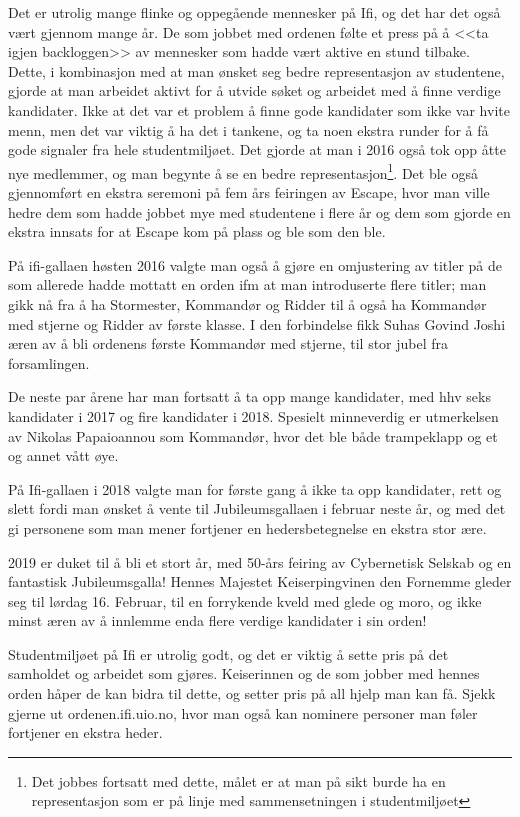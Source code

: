 Det er utrolig mange flinke og oppegående mennesker på Ifi, og det har det også vært gjennom mange år. De som jobbet med ordenen følte et press på å <<ta igjen backloggen>> av mennesker som hadde vært aktive en stund tilbake. Dette, i kombinasjon med at man ønsket seg bedre representasjon av studentene, gjorde at man arbeidet aktivt for å utvide søket og arbeidet med å finne verdige kandidater. Ikke at det var et problem å finne gode kandidater som ikke var hvite menn, men det var viktig å ha det i tankene, og ta noen ekstra runder for å få gode signaler fra hele studentmiljøet. Det gjorde at man i 2016 også tok opp åtte nye medlemmer, og man begynte å se en bedre representasjon\footnote{Det jobbes fortsatt med dette, målet er at man på sikt burde ha en representasjon som er på linje med sammensetningen i studentmiljøet}. Det ble også gjennomført en ekstra seremoni på fem års feiringen av Escape, hvor man ville hedre dem som hadde jobbet mye med studentene i flere år og dem som gjorde en ekstra innsats for at Escape kom på plass og ble som den ble.

På ifi-gallaen høsten 2016 valgte man også å gjøre en omjustering av titler på de som allerede hadde mottatt en orden ifm at man introduserte flere titler; man gikk nå fra å ha Stormester, Kommandør og Ridder til å også ha Kommandør med stjerne og Ridder av første klasse. I den forbindelse fikk Suhas Govind Joshi æren av å bli ordenens første Kommandør med stjerne, til stor jubel fra forsamlingen.

De neste par årene har man fortsatt å ta opp mange kandidater, med hhv seks kandidater i 2017 og fire kandidater i 2018. Spesielt minneverdig er utmerkelsen av Nikolas Papaioannou som Kommandør, hvor det ble både trampeklapp og et og annet vått øye.

På Ifi-gallaen i 2018 valgte man for første gang å ikke ta opp kandidater, rett og slett fordi man ønsket å vente til Jubileumsgallaen i februar neste år, og med det gi personene som man mener fortjener en hedersbetegnelse en ekstra stor ære.

2019 er duket til å bli et stort år, med 50-års feiring av Cybernetisk Selskab og en fantastisk Jubileumsgalla! Hennes Majestet Keiserpingvinen den Fornemme gleder seg til lørdag 16. Februar, til en forrykende kveld med glede og moro, og ikke minst æren av å innlemme enda flere verdige kandidater i sin orden!

Studentmiljøet på Ifi er utrolig godt, og det er viktig å sette pris på det samholdet og arbeidet som gjøres. Keiserinnen og de som jobber med hennes orden håper de kan bidra til dette, og setter pris på all hjelp man kan få. Sjekk gjerne ut ordenen.ifi.uio.no, hvor man også kan nominere personer man føler fortjener en ekstra heder.
